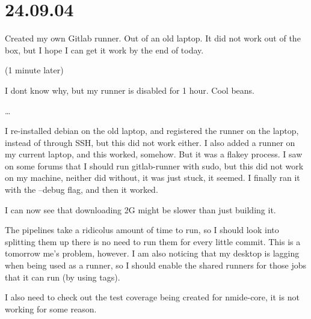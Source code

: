 \section{24.09.04}

Created my own Gitlab runner. Out of an old laptop. It did not work out of the box, but I hope
I can get it work by the end of today.

(1 minute later)

I dont know why, but my runner is disabled for 1 hour. Cool beans.

\dots

I re-installed debian on the old laptop, and registered the runner on the laptop, instead of
through SSH, but this did not work either. I also added a runner on my current laptop, and
this worked, somehow. But it was a flakey process. I saw on some forums that I should run
gitlab-runner with sudo, but this did not work on my machine, neither did without, it was
just stuck, it seemed. I finally ran it with the --debug flag, and then it worked.

I can now see that downloading 2G might be slower than just building it.

The pipelines take a ridicolus amount of time to run, so I should look into splitting them up
there is no need to run them for every little commit. This is a tomorrow me's problem, however.
I am also noticing that my desktop is lagging when being used as a runner, so I should enable
the shared runners for those jobs that it can run (by using tags).

I also need to check out the test coverage being created for nmide-core, it is not working for
some reason.
